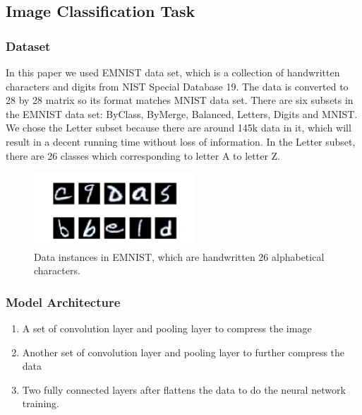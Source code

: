 \subsection{Image Classification Task}

\subsubsection{Dataset}

In this paper we used EMNIST \cite{emnist} data set, which is a collection of handwritten characters and digits from NIST Special Database 19. The data is converted to 28 by 28 matrix so its format matches MNIST data set. There are six subsets in the EMNIST data set: ByClass, ByMerge, Balanced, Letters, Digits and MNIST. We chose the Letter subset because there are around 145k data in it, which will result in a decent running time without loss of information. In the Letter subset, there are 26 classes which corresponding to letter A to letter Z.
\begin{figure}[htp]
    \centering
    \includegraphics[width=6cm]{img/EMNIST.png}
    \caption{Data instances in EMNIST, which are handwritten 26 alphabetical characters.}
    \label{fig:EMNIST}
\end{figure}


\subsubsection{Model Architecture}
\begin{enumerate}[start=1,label={\bfseries\arabic*:}]
    \item A set of convolution layer and pooling layer to compress the image
    \item Another set of convolution layer and pooling layer to further compress the data
    \item Two fully connected layers after flattens the data to do the neural network training.
    \end{enumerate}

